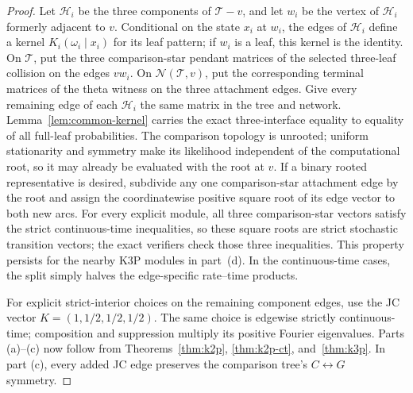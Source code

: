 \documentclass[11pt]{article}
\theoremstyle{remark}\newtheorem{remark}[theorem]{Remark}
\begin{document}
\begin{proof}
Let $\mathcal H_i$ be the three components of $\mathcal T-v$, and let $w_i$ be the vertex of $\mathcal H_i$ formerly adjacent to $v$. Conditional on the state $x_i$ at $w_i$, the edges of $\mathcal H_i$ define a kernel $K_i(\omega_i\mid x_i)$ for its leaf pattern; if $w_i$ is a leaf, this kernel is the identity. On $\mathcal T$, put the three comparison-star pendant matrices of the selected three-leaf collision on the edges $vw_i$. On $\mathcal N(\mathcal T,v)$, put the corresponding terminal matrices of the theta witness on the three attachment edges. Give every remaining edge of each $\mathcal H_i$ the same matrix in the tree and network. Lemma~\ref{lem:common-kernel} carries the exact three-interface equality to equality of all full-leaf probabilities. The comparison topology is unrooted; uniform stationarity and symmetry make its likelihood independent of the computational root, so it may already be evaluated with the root at $v$. If a binary rooted representative is desired, subdivide any one comparison-star attachment edge by the root and assign the coordinatewise positive square root of its edge vector to both new arcs. For every explicit module, all three comparison-star vectors satisfy the strict continuous-time inequalities, so these square roots are strict stochastic transition vectors; the exact verifiers check those three inequalities. This property persists for the nearby K3P modules in part~(d). In the continuous-time cases, the split simply halves the edge-specific rate--time products.

For explicit strict-interior choices on the remaining component edges, use the JC vector $K=(1,1/2,1/2,1/2)$. The same choice is edgewise strictly continuous-time; composition and suppression multiply its positive Fourier eigenvalues. Parts (a)--(c) now follow from Theorems~\ref{thm:k2p}, \ref{thm:k2p-ct}, and~\ref{thm:k3p}. In part (c), every added JC edge preserves the comparison tree's $C\leftrightarrow G$ symmetry.


\end{proof}
\end{document}
